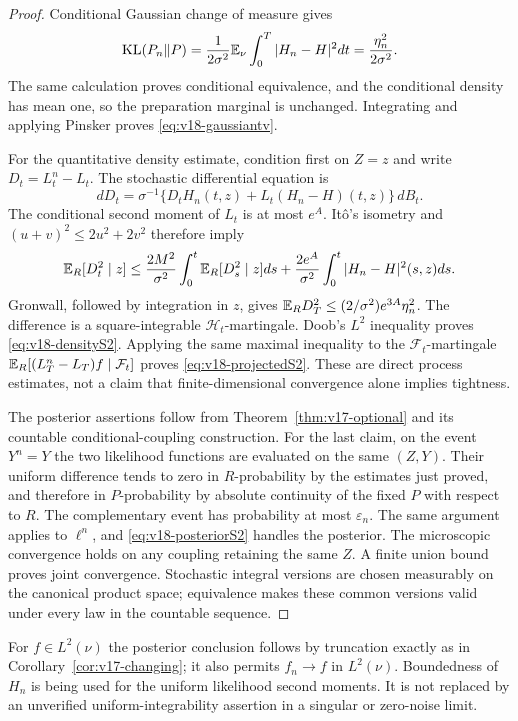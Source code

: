 \begin{proof}
Conditional Gaussian change of measure gives
\[
 \operatorname{KL}(P_n\|P)=\frac1{2\sigma^2}\mathbb E_\nu\int_0^T|H_n-H|^2dt
                         =\frac{\eta_n^2}{2\sigma^2}.
\]
The same calculation proves conditional equivalence, and the conditional
density has mean one, so the preparation marginal is unchanged. Integrating
and applying Pinsker proves \eqref{eq:v18-gaussiantv}.

For the quantitative density estimate, condition first on $Z=z$ and write
$D_t=L_t^n-L_t$. The stochastic differential equation is
\[
 dD_t=\sigma^{-1}\{D_tH_n(t,z)+L_t(H_n-H)(t,z)\}\,dB_t.
\]
The conditional second moment of $L_t$ is at most $e^A$. It\^o's isometry
and $(u+v)^2\le2u^2+2v^2$ therefore imply
\[
 \mathbb E_R[D_t^2\mid z]
 \le\frac{2M^2}{\sigma^2}\int_0^t\mathbb E_R[D_s^2\mid z]ds
     +\frac{2e^A}{\sigma^2}\int_0^t|H_n-H|^2(s,z)ds.
\]
Gronwall, followed by integration in $z$, gives
$\mathbb E_R D_T^2\le(2/\sigma^2)e^{3A}\eta_n^2$.
The difference is a square-integrable $\mathcal H_t$-martingale.
Doob's $L^2$ inequality proves \eqref{eq:v18-densityS2}. Applying the same
maximal inequality to the $\mathcal F_t$-martingale
$\mathbb E_R[(L_T^n-L_T)f\mid\mathcal F_t]$ proves
\eqref{eq:v18-projectedS2}. These are direct process estimates, not a
claim that finite-dimensional convergence alone implies tightness.

The posterior assertions follow from Theorem~\ref{thm:v17-optional} and
its countable conditional-coupling construction. For the last claim,
on the event $Y^n=Y$ the two likelihood functions are evaluated on the
same $(Z,Y)$. Their uniform difference tends to zero in $R$-probability
by the estimates just proved, and therefore in $P$-probability by absolute
continuity of the fixed $P$ with respect to $R$. The complementary event
has probability at most $\varepsilon_n$. The same argument applies to
$\ell^n$, and \eqref{eq:v18-posteriorS2} handles the posterior. The
microscopic convergence holds on any coupling retaining the same $Z$.
A finite union bound proves joint convergence. Stochastic integral versions
are chosen measurably on the canonical product space; equivalence makes
these common versions valid under every law in the countable sequence.
\end{proof}

For $f\in L^2(\nu)$ the posterior conclusion follows by truncation exactly
as in Corollary~\ref{cor:v17-changing}; it also permits $f_n\to f$ in
$L^2(\nu)$. Boundedness of $H_n$ is being used for the uniform likelihood
second moments. It is not replaced by an unverified uniform-integrability
assertion in a singular or zero-noise limit.

